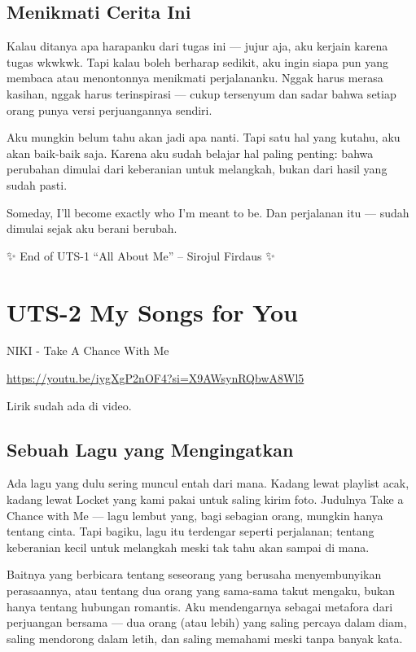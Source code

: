 \documentclass[
  letterpaper,
  DIV=11,
  numbers=noendperiod]{scrreprt}
\begin{document}
\section{Menikmati Cerita Ini}\label{menikmati-cerita-ini}

Kalau ditanya apa harapanku dari tugas ini --- jujur aja, aku kerjain
karena tugas wkwkwk. Tapi kalau boleh berharap sedikit, aku ingin siapa
pun yang membaca atau menontonnya menikmati perjalananku. Nggak harus
merasa kasihan, nggak harus terinspirasi --- cukup tersenyum dan sadar
bahwa setiap orang punya versi perjuangannya sendiri.

Aku mungkin belum tahu akan jadi apa nanti. Tapi satu hal yang kutahu,
aku akan baik-baik saja. Karena aku sudah belajar hal paling penting:
bahwa perubahan dimulai dari keberanian untuk melangkah, bukan dari
hasil yang sudah pasti.

Someday, I'll become exactly who I'm meant to be. Dan perjalanan itu ---
sudah dimulai sejak aku berani berubah.

✨ End of UTS-1 ``All About Me'' -- Sirojul Firdaus ✨

\chapter{UTS-2 My Songs for You}\label{uts-2-my-songs-for-you}

NIKI - Take A Chance With Me

\url{https://youtu.be/iygXgP2nOF4?si=X9AWsynRQbwA8Wl5}

Lirik sudah ada di video.

\section{Sebuah Lagu yang
Mengingatkan}\label{sebuah-lagu-yang-mengingatkan}

Ada lagu yang dulu sering muncul entah dari mana. Kadang lewat playlist
acak, kadang lewat Locket yang kami pakai untuk saling kirim foto.
Judulnya Take a Chance with Me --- lagu lembut yang, bagi sebagian
orang, mungkin hanya tentang cinta. Tapi bagiku, lagu itu terdengar
seperti perjalanan; tentang keberanian kecil untuk melangkah meski tak
tahu akan sampai di mana.

Baitnya yang berbicara tentang seseorang yang berusaha menyembunyikan
perasaannya, atau tentang dua orang yang sama-sama takut mengaku, bukan
hanya tentang hubungan romantis. Aku mendengarnya sebagai metafora dari
perjuangan bersama --- dua orang (atau lebih) yang saling percaya dalam
diam, saling mendorong dalam letih, dan saling memahami meski tanpa
banyak kata.
\end{document}
